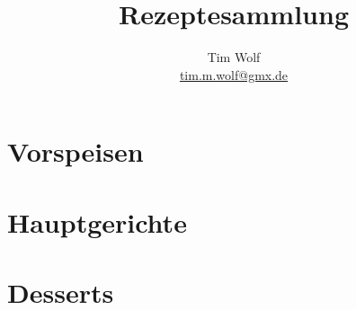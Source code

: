 \documentclass[%
a4paper,
11pt
]{article}
\begin{document}
\title{Rezeptesammlung}
\author{Tim Wolf\\ \href{mailto:tim.m.wolf@gmx.de}{tim.m.wolf@gmx.de}}
\maketitle
\cleardoublepage


\tableofcontents

\newpage

\section{Vorspeisen}

% 
%
% 

\section{Hauptgerichte}



\section{Desserts}

\end{document}
